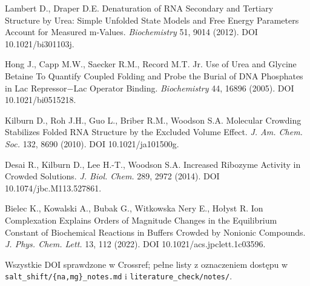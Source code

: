 \documentclass[11pt,a4paper]{article}
\begin{document}
\begin{enumerate}[label={[\arabic*]},ref={\arabic*},leftmargin=*,itemsep=0pt]
\item\label{b:ld12} Lambert D., Draper D.E. Denaturation of RNA Secondary and Tertiary Structure by Urea: Simple Unfolded State Models and Free Energy Parameters Account for Measured m-Values. \emph{Biochemistry} 51, 9014 (2012). DOI 10.1021/bi301103j.
\item\label{b:hong05} Hong J., Capp M.W., Saecker R.M., Record M.T. Jr. Use of Urea and Glycine Betaine To Quantify Coupled Folding and Probe the Burial of DNA Phosphates in Lac Repressor$-$Lac Operator Binding. \emph{Biochemistry} 44, 16896 (2005). DOI 10.1021/bi0515218.
\item\label{b:kil10} Kilburn D., Roh J.H., Guo L., Briber R.M., Woodson S.A. Molecular Crowding Stabilizes Folded RNA Structure by the Excluded Volume Effect. \emph{J. Am. Chem. Soc.} 132, 8690 (2010). DOI 10.1021/ja101500g.
\item\label{b:desai} Desai R., Kilburn D., Lee H.-T., Woodson S.A. Increased Ribozyme Activity in Crowded Solutions. \emph{J. Biol. Chem.} 289, 2972 (2014). DOI 10.1074/jbc.M113.527861.
\item\label{b:bielec22} Bielec K., Kowalski A., Bubak G., Witkowska Nery E., Hołyst R. Ion Complexation Explains Orders of Magnitude Changes in the Equilibrium Constant of Biochemical Reactions in Buffers Crowded by Nonionic Compounds. \emph{J. Phys. Chem. Lett.} 13, 112 (2022). DOI 10.1021/acs.jpclett.1c03596.
\end{enumerate}
Wszystkie DOI sprawdzone w Crossref; pełne listy z oznaczeniem dostępu w \texttt{salt\_shift/\{na,mg\}\_notes.md} i \texttt{literature\_check/notes/}.
\end{document}

